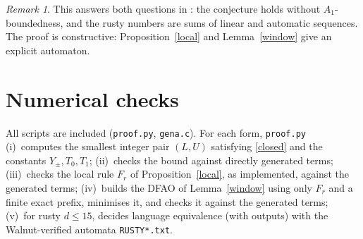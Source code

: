 \documentclass[11pt]{article}
\theoremstyle{remark}\newtheorem{remark}[theorem]{Remark}
\theoremstyle{definition}\newtheorem{definition}[theorem]{Definition}
\begin{document}
\begin{remark}
This answers both questions in \cite[\S5]{fj}: the conjecture holds without \(A_1\)-boundedness, and the rusty numbers are sums of linear and automatic sequences. The proof is constructive: Proposition~\ref{local} and Lemma~\ref{window} give an explicit automaton.
\end{remark}

\section{Numerical checks}\label{num}
All scripts are included (\texttt{proof.py}, \texttt{gena.c}). For each form, \texttt{proof.py} (i)~computes the smallest integer pair \((L,U)\) satisfying \eqref{closed} and the constants \(Y_\pm,T_0,T_1\); (ii)~checks the bound against directly generated terms; (iii)~checks the local rule \(F_r\) of Proposition~\ref{local}, as implemented, against the generated terms; (iv)~builds the DFAO of Lemma~\ref{window} using only \(F_r\) and a finite exact prefix, minimises it, and checks it against the generated terms; (v)~for rusty \(d\le15\), decides language equivalence (with outputs) with the Walnut-verified automata \texttt{RUSTY*.txt}.
\end{document}

